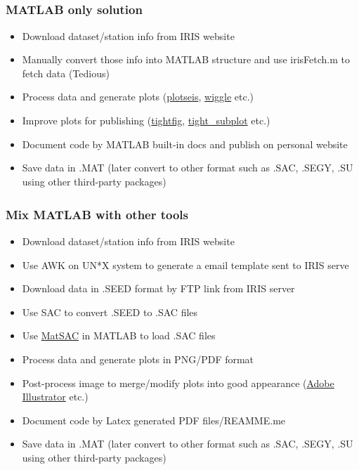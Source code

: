 \documentclass[compress]{beamer}
\begin{document}
\begin{frame}
	\frametitle{MATLAB\textsuperscript{\textregistered} only solution}
	\begin{itemize}
		\item Download dataset/station info from IRIS website
		\item Manually convert those info into MATLAB structure and use irisFetch.m to fetch data (Tedious)
		\item Process data and generate plots (\href{http://www.crewes.org/ResearchLinks/FreeSoftware/}{plotseis}, \href{http://www.mathworks.com/matlabcentral/fileexchange/38691-wiggle}{wiggle} etc.)
		\item Improve plots for publishing (\href{http://www.mathworks.com/matlabcentral/fileexchange/34055-tightfig}{tightfig}, \href{http://www.mathworks.com/matlabcentral/fileexchange/27991-tight-subplot-nh--nw--gap--marg-h--marg-w-}{tight\_subplot} etc.)
			\item Document code by MATLAB built-in docs and publish on personal website
		\item Save data in .MAT (later convert to other format such as .SAC, .SEGY, .SU using other third-party packages)
	\end{itemize}
\end{frame}

\begin{frame}
	\frametitle{Mix MATLAB\textsuperscript{\textregistered} with other tools}
	\begin{itemize}
		\item Download dataset/station info from IRIS website
		\item Use AWK on UN*X system to generate a email template sent to IRIS serve
		\item Download data in .SEED format by FTP link from IRIS server
		\item Use SAC to convert .SEED to .SAC files
		\item Use \href{http://geophysics.eas.gatech.edu/people/zpeng/Teaching/SAC_Tutorial/\#part2_6}{MatSAC} in MATLAB to load .SAC files
		\item Process data and generate plots in PNG/PDF format
		\item Post-process image to merge/modify plots into good appearance (\href{http://www.adobe.com/products/illustrator.html}{Adobe Illustrator} etc.)
		\item Document code by Latex generated PDF files/REAMME.me
		\item Save data in .MAT (later convert to other format such as .SAC, .SEGY, .SU using other third-party packages)
	\end{itemize}
\end{frame}
\end{document}
